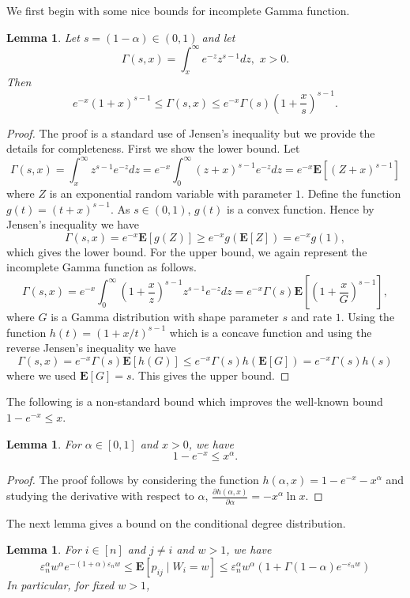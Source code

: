 \documentclass[11pt, reqno]{amsart}
\numberwithin{equation}{section}
\theoremstyle{plain} %
\newtheorem{lemma}[theorem]{Lemma}
\theoremstyle{definition} %
\newcommand{\eps}{\varepsilon}
\newcommand{\E}{\mathbf{E}}
\newcommand{\revise}[1]{{\color{black}#1}}
\begin{document}
\revise{
We first begin with some nice bounds for incomplete Gamma function. 
\begin{lemma}\label{lemma:incompletegamma}
Let $s=(1-\alpha)\in (0,1)$ and let
$$\Gamma(s, x)= \int_x^\infty e^{-z}z^{s-1}dz, \, \, x>0.$$ Then
$$e^{-x} (1+x)^{s-1}\le \Gamma(s,x) \le e^{-x}\Gamma(s) \left(1+\frac{x}{s}\right)^{s-1}.$$
\end{lemma}
\begin{proof}
The proof is a standard use of Jensen's inequality but we provide the details for completeness. First we show the lower bound.
Let $$\Gamma(s,x)= \int_x^\infty z^{s-1} e^{-z}dz= e^{-x} \int_0^\infty (z+x)^{s-1} e^{-z}dz=e^{-x}\E[(Z+x)^{s-1}]$$
where $Z$ is an exponential random variable with parameter $1$. Define the function $g(t)=(t+x)^{s-1}$. As $s\in (0,1)$, $g(t)$ is a convex function. Hence by Jensen's inequality we have
$$\Gamma(s,x)= e^{-x}\E[ g(Z)]\ge e^{-x}g(\E[Z])=e^{-x}g(1),$$
which gives the lower bound. For the upper bound, we again represent the incomplete Gamma function as follows.
$$\Gamma(s, x)= e^{-x}\int_0^{\infty} \left(1+\frac{x}{z}\right)^{s-1} z^{s-1}e^{-z}dz=e^{-x}\Gamma(s)\E\left[\left(1+\frac{x}{G}\right)^{s-1}\right],$$
where $G$ is a Gamma distribution with shape parameter $s$ and rate $1$. Using the function $h(t)= (1+x/t)^{s-1}$ which is a concave function and using the reverse Jensen's inequality we have
$$\Gamma(s,x)=e^{-x}\Gamma(s)\E[h(G)]\le e^{-x}\Gamma(s) h(\E[G])= e^{-x}\Gamma(s) h(s)$$
where we used $\E[G]=s$. This gives the upper bound. 
\end{proof}

The following is a non-standard bound which improves the well-known bound $1-e^{-x}\le x$.
\begin{lemma}\label{lemma:surprising}
For $\alpha\in [0,1]$ and $x>0$, we have
$$1-e^{-x} \le x^{\alpha}.$$
\end{lemma}
\begin{proof}
The proof follows by considering the function $h(\alpha, x)= 1-e^{-x}-x^{\alpha}$ and studying the derivative with respect to $\alpha$, $\frac{\partial h(\alpha, x)}{\partial \alpha}=- x^\alpha \ln x$.
\end{proof}

The next lemma gives a bound on the conditional degree distribution. 
\begin{lemma} 
 For $i\in [n]$ and $j\neq i$ and $w>1$, we have
\begin{equation}\label{cond:degree}
 \eps_n^{\alpha} w^{\alpha} e^{-(1+\alpha) \eps_n w}\le \E[ p_{ij}\mid W_i=w] \le \eps_n^{\alpha}w^\alpha(1+\Gamma(1-\alpha) e^{-\eps_n w})
 \end{equation}
 In particular, for fixed $w>1$, 
 

\end{lemma}}
\end{document}

